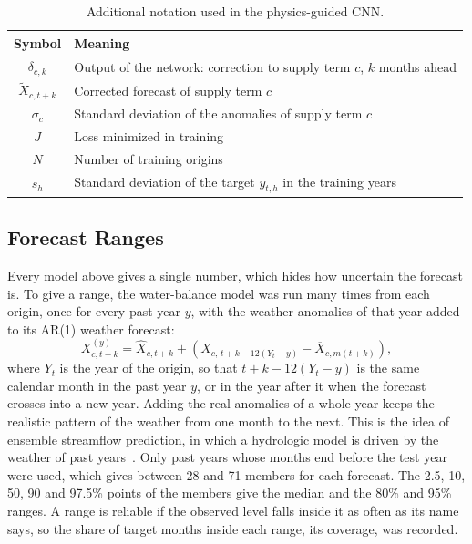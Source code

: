 \documentclass{article}
\begin{document}
\begin{table}[htbp]
\centering
\caption{Additional notation used in the physics-guided CNN.}
\label{tab:notation-cnn}
\renewcommand{\arraystretch}{1.3}
\begin{tabular}{||c|l||}
\hline\hline
Symbol & Meaning \\
\hline\hline
$\delta_{c,k}$ & Output of the network: correction to supply term $c$, $k$ months ahead \\
$\tilde X_{c,t+k}$ & Corrected forecast of supply term $c$ \\
$\sigma_c$ & Standard deviation of the anomalies of supply term $c$ \\
$J$ & Loss minimized in training \\
$N$ & Number of training origins \\
$s_h$ & Standard deviation of the target $y_{t,h}$ in the training years \\
\hline\hline
\end{tabular}
\end{table}

\subsection{Forecast Ranges}
\label{sec:ranges}

Every model above gives a single number, which hides how uncertain the forecast is. To give a
range, the water-balance model was run many times from each origin, once for every past year $y$,
with the weather anomalies of that year added to its AR(1) weather forecast:
\begin{equation}
X^{(y)}_{c,t+k} = \hat X_{c,t+k} + \left( X_{c,\,t+k-12(Y_t - y)} - \overline{X}_{c,m(t+k)}
\right), \label{eq:trace}
\end{equation}
where $Y_t$ is the year of the origin, so that $t+k-12(Y_t - y)$ is the same calendar month in the
past year $y$, or in the year after it when the forecast crosses into a new year. Adding the real
anomalies of a whole year keeps the realistic pattern of the weather from one month to the next.
This is the idea of ensemble streamflow prediction, in which a hydrologic model is driven by the
weather of past years~\cite{day1985}. Only past years whose months end before the test year were
used, which gives between 28 and 71 members for each forecast. The 2.5, 10, 50, 90 and 97.5\%
points of the members give the median and the 80\% and 95\% ranges. A range is reliable if the
observed level falls inside it as often as its name says, so the share of target months inside
each range, its coverage, was recorded.
\end{document}
